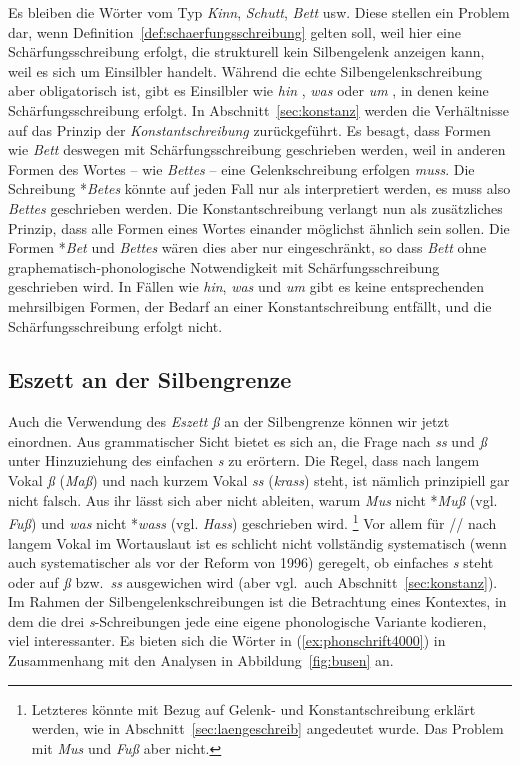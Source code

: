 Es bleiben die Wörter vom Typ \textit{Kinn}, \textit{Schutt}, \textit{Bett} usw.
Diese stellen ein Problem dar, wenn Definition~\ref{def:schaerfungsschreibung} gelten soll, weil hier eine Schärfungsschreibung erfolgt, die strukturell kein Silbengelenk anzeigen kann, weil es sich um Einsilbler handelt.
Während die echte Silbengelenkschreibung aber obligatorisch ist, gibt es Einsilbler wie \textit{hin} \textipa{[hIn]}, \textit{was} \textipa{[vas]} oder \textit{um} \textipa{[PUm]}, in denen keine Schärfungsschreibung erfolgt.
In Abschnitt~\ref{sec:konstanz} werden die Verhältnisse auf das Prinzip der \textit{Konstantschreibung} zurückgeführt.
Es besagt, dass Formen wie \textit{Bett} deswegen mit Schärfungsschreibung geschrieben werden, weil in anderen Formen des Wortes -- wie \zB \textit{Bettes} -- eine Gelenkschreibung erfolgen \textit{muss}.
Die Schreibung *\textit{Betes} könnte auf jeden Fall nur als \textipa{[be:t@s]} interpretiert werden, es muss also \textit{Bettes} geschrieben werden.
Die Konstantschreibung verlangt nun als zusätzliches Prinzip, dass alle Formen eines Wortes einander möglichst ähnlich sein sollen.
Die Formen *\textit{Bet} und \textit{Bettes} wären dies aber nur eingeschränkt, so dass \textit{Bett} ohne graphematisch-phonologische Notwendigkeit mit Schärfungsschreibung geschrieben wird.
In Fällen wie \textit{hin}, \textit{was} und \textit{um} gibt es keine entsprechenden mehrsilbigen Formen, der Bedarf an einer Konstantschreibung entfällt, und die Schärfungsschreibung erfolgt nicht.

\subsection[Eszett an der Silbengrenze]{Eszett an der Silbengrenze}

\label{sec:eszett}

Auch die Verwendung des \textit{Eszett} \textit{ß} an der Silbengrenze können wir jetzt einordnen.
Aus grammatischer Sicht bietet es sich an, die Frage nach \textit{ss} und \textit{ß} unter Hinzuziehung des einfachen \textit{s} zu erörtern.
Die Regel, dass nach langem Vokal \textit{ß} (\textit{Maß}) und nach kurzem Vokal \textit{ss} (\textit{krass}) steht, ist nämlich prinzipiell gar nicht falsch.
Aus ihr lässt sich aber nicht ableiten, warum \zB \textit{Mus} nicht *\textit{Muß} (vgl. \textit{Fuß}) und \textit{was} nicht *\textit{wass} (vgl. \textit{Hass}) geschrieben wird.%
\footnote{Letzteres könnte mit Bezug auf Gelenk- und Konstantschreibung erklärt werden, wie in Abschnitt~\ref{sec:laengeschreib} angedeutet wurde.
Das Problem mit \textit{Mus} und \textit{Fuß} aber nicht.}
Vor allem für // nach langem Vokal im Wortauslaut ist es schlicht nicht vollständig systematisch (wenn auch systematischer als vor der Reform von 1996) geregelt, ob einfaches \textit{s} steht oder auf \textit{ß} bzw.\ \textit{ss} ausgewichen wird (aber vgl.\ auch Abschnitt~\ref{sec:konstanz}).
Im Rahmen der Silbengelenkschreibungen ist die Betrachtung eines Kontextes, in dem die drei \textit{s}-Schreibungen jede eine eigene phonologische Variante kodieren, viel interessanter.
Es bieten sich die Wörter in (\ref{ex:phonschrift4000}) in Zusammenhang mit den Analysen in Abbildung~\ref{fig:busen} an.

